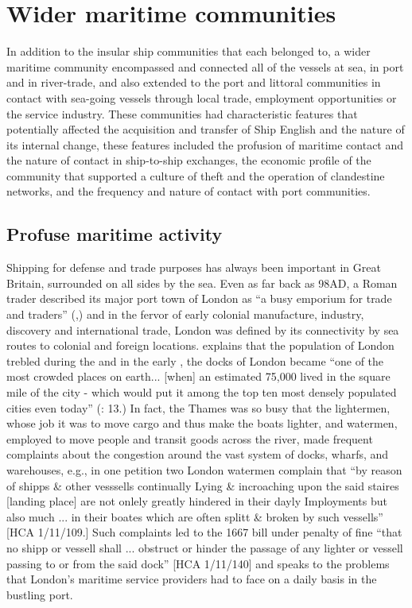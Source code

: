 \section{{Wider maritime communities}}%

In addition to the insular ship communities that each  belonged to, a wider maritime community encompassed and connected all of the vessels at sea, in port and in river-trade, and also extended to the port and littoral communities in contact with sea-going vessels through local trade, employment opportunities or the service industry. These communities had characteristic features that potentially affected the acquisition and transfer of Ship English and the nature of its internal change, these features included the profusion of maritime contact and the nature of contact in ship-to-ship exchanges, the economic profile of the community that supported a culture of theft and the operation of clandestine networks, and the frequency and nature of contact with port communities. 

\subsection{{Profuse maritime activity}}%

Shipping for defense and trade purposes has always been important in Great Britain, surrounded on all sides by the sea. Even as far back as 98AD, a Roman trader described its major port town of London as “a busy emporium for trade and traders” (\citealt{Tacitus1913},) and in the fervor of early colonial manufacture, industry, discovery and international trade, London was defined by its connectivity by sea routes to colonial and foreign locations. \citeauthor{Bicheno2012} explains that the population of London trebled during the  and in the early , the docks of London became “one of the most crowded places on earth... [when] an estimated 75,000 lived in the square mile of the city - which would put it among the top ten most densely populated cities even today” (\citealt{Bicheno2012}: 13.) In fact, the Thames was so busy that the lightermen, whose job it was to move cargo and thus make the boats lighter, and watermen, employed to move people and transit goods across the river, made frequent complaints about the congestion around the vast system of docks, wharfs, and warehouses, e.g., in one petition two London watermen complain that “by reason of shipps \& other vesssells continually Lying \& incroaching upon the said staires [landing place] are not onlely greatly hindered in their dayly Imployments but also much ... in their boates which are often splitt \& broken by such vessells” [HCA 1/11/109.]  Such complaints led to the 1667 bill under penalty of fine “that no shipp or vessell shall ... obstruct or hinder the passage of any lighter or vessell passing to or from the said dock” [HCA 1/11/140] and speaks to the problems that London’s maritime service providers had to face on a daily basis in the bustling port. 

